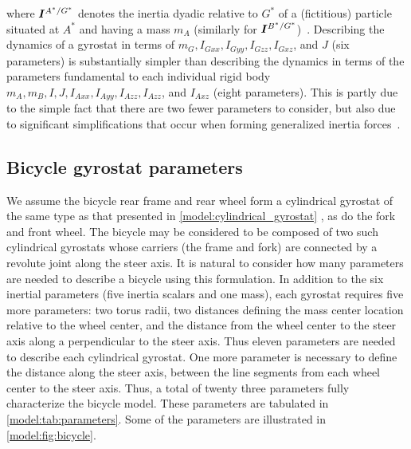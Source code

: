 where $\boldsymbol{I}^{A^*/G^*}$ denotes the inertia dyadic relative to $G^*$ of a
(fictitious) particle situated at $A^*$ and having a mass $m_A$ (similarly for
$\boldsymbol{I}^{B^*/G^*}$)~\cite{Kane1985}. Describing the dynamics of a gyrostat in
terms of $m_G, I_{Gxx}, I_{Gyy}, I_{Gzz}, I_{Gxz}$, and $J$ (six parameters) is
substantially simpler than describing the dynamics in terms of the parameters
fundamental to each individual rigid body $m_A, m_B, I, J, I_{Axx}, I_{Ayy},
I_{Azz}, I_{Azz}$, and $I_{Axz}$ (eight parameters). This is partly due to the
simple fact that there are two fewer parameters to consider, but also due to
significant simplifications that occur when forming generalized inertia
forces~\cite{Mitiguy2001}.

\subsection{Bicycle gyrostat parameters} \label{model:bicycle_gyrostat_parameters}
We assume the bicycle rear frame and rear wheel form a cylindrical gyrostat of
the same type as that presented in \autoref{model:cylindrical_gyrostat} , as do
the fork and front wheel. The bicycle may be considered to be composed of two
such cylindrical gyrostats whose carriers (the frame and fork) are connected by
a revolute joint along the steer axis. It is natural to consider how many
parameters are needed to describe a bicycle using this formulation. In addition
to the six inertial parameters (five inertia scalars and one mass), each
gyrostat requires five more parameters: two torus radii, two distances defining
the mass center location relative to the wheel center, and the distance from
the wheel center to the steer axis along a perpendicular to the steer axis.
Thus eleven parameters are needed to describe each cylindrical gyrostat. One
more parameter is necessary to define the distance along the steer axis,
between the line segments from each wheel center to the steer axis. Thus, a
total of twenty three parameters fully characterize the bicycle model. These
parameters are tabulated in \autoref{model:tab:parameters}.  Some of the
parameters are illustrated in \autoref{model:fig:bicycle}.
